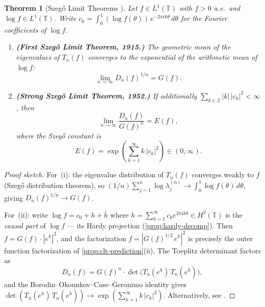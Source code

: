 \documentclass[12pt]{amsart}
\newtheorem{theorem}{Theorem}[section]
\theoremstyle{definition}
\theoremstyle{remark}
\newcommand{\bT}{\mathbb{T}}
\newcommand{\Z}{\mathbb{Z}}
\newcommand{\Htwo}{H^2}
\begin{document}
\begin{theorem}[Szeg\H{o} Limit Theorems {\cite[Chapter~5]{BottcherSilbermann}}]\label{thm:szego}
Let $f \in L^1(\bT)$ with $f > 0$ a.e.\ and $\log f \in L^1(\bT)$. Write $c_k = \int_0^1 (\log f(\theta))\, e^{-2\pi i k\theta}\, d\theta$ for the Fourier coefficients of $\log f$.
\begin{enumerate}[label=(\roman*)]
\item \textbf{(First Szeg\H{o} Limit Theorem, 1915.)} The geometric mean of the eigenvalues of $T_n(f)$ converges to the exponential of the arithmetic mean of $\log f$:
\begin{equation}\label{eq:szego-first}
\lim_{n \to \infty} D_n(f)^{1/n} = G(f).
\end{equation}

\item \textbf{(Strong Szeg\H{o} Limit Theorem, 1952.)} If additionally $\sum_{k \in \Z} |k|\, |c_k|^2 < \infty$, then
\begin{equation}\label{eq:szego-strong}
\lim_{n \to \infty} \frac{D_n(f)}{G(f)^n} = E(f),
\end{equation}
where the \emph{Szeg\H{o} constant} is
\begin{equation}\label{eq:szego-constant}
E(f) = \exp\!\left(\sum_{k=1}^{\infty} k\, |c_k|^2\right) \in (0, \infty).
\end{equation}
\end{enumerate}
\end{theorem}

\begin{proof}[Proof sketch]
For~(i): the eigenvalue distribution of $T_n(f)$ converges weakly to $f$ (Szeg\H{o} distribution theorem), so $(1/n)\sum_{j=1}^n \log \lambda_j^{(n)} \to \int_0^1 \log f(\theta)\, d\theta$, giving $D_n(f)^{1/n} \to G(f)$.

For~(ii): write $\log f = c_0 + h + \bar{h}$ where $h = \sum_{k=1}^{\infty} c_k e^{2\pi i k \theta} \in \Htwo(\bT)$ is the \emph{causal part} of $\log f$ --- its Hardy projection (\cref{prop:hardy-decomp}). Then $f = G(f) \cdot |e^h|^2$, and the factorization $f = |G(f)^{1/2}\, e^h|^2$ is precisely the outer function factorization of \cref{prop:clt-prediction}(ii). The Toeplitz determinant factors as
\[
D_n(f) = G(f)^n \cdot \det\bigl(T_n(e^h)\, T_n(e^{\bar{h}})\bigr),
\]
and the Borodin--Okounkov--Case--Geronimo identity \cite[Chapter~5]{BottcherSilbermann} gives $\det(T_n(e^h)\, T_n(e^{\bar{h}})) \to \exp(\sum_{k=1}^{\infty} k\, |c_k|^2)$. Alternatively, see \cite[Chapter~2]{Simon}.
\end{proof}
\end{document}
